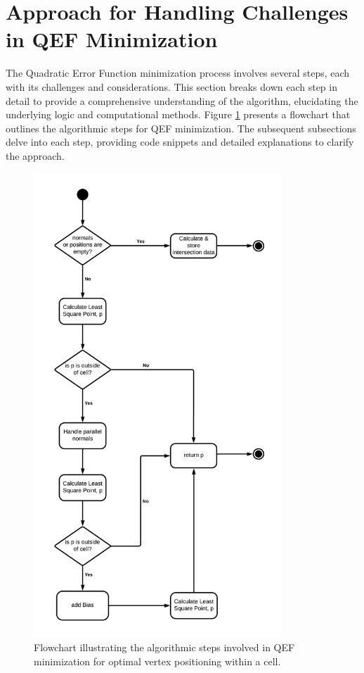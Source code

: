 \section{Approach for Handling Challenges in QEF Minimization}
The Quadratic Error Function minimization process involves several steps, each with its challenges and considerations. This section breaks down each step in detail to provide a comprehensive understanding of the algorithm, elucidating the underlying logic and computational methods. Figure \ref{fig:QEF-Flowchart} presents a flowchart that outlines the algorithmic steps for QEF minimization. The subsequent subsections delve into each step, providing code snippets and detailed explanations to clarify the approach.
\begin{figure}
    \centering
    \includegraphics[width=0.83\textwidth]{Figures/QEF-FlowChart.jpeg}
    \decoRule
    \caption{Flowchart illustrating the algorithmic steps involved in QEF minimization for optimal vertex positioning within a cell.}
    \label{fig:QEF-Flowchart}
\end{figure}

